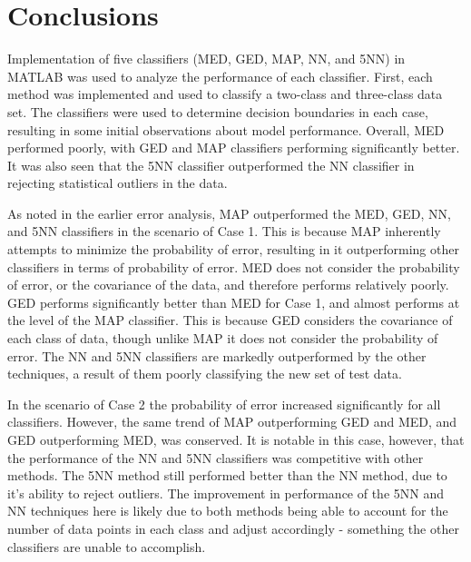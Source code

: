 \documentclass[article, 1.5space, letterpaper, 12pt, oneside, header, footer]{SydeClass}
\begin{document}


\section{Conclusions}
Implementation of five classifiers (MED, GED, MAP, NN, and 5NN) in MATLAB was used to analyze the performance of each classifier. First, each method was implemented and used to classify a two-class and three-class data set. The classifiers were used to determine decision boundaries in each case, resulting in some initial observations about model performance. Overall, MED performed poorly, with GED and MAP classifiers performing significantly better. It was also seen that the 5NN classifier outperformed the NN classifier in rejecting statistical outliers in the data.

As noted in the earlier error analysis, MAP outperformed the MED, GED, NN, and 5NN classifiers in the scenario of Case 1. This is because MAP inherently attempts to minimize the probability of error, resulting in it outperforming other classifiers in terms of probability of error. MED does not consider the probability of error, or the covariance of the data, and therefore performs relatively poorly. GED performs significantly better than MED for Case 1, and almost performs at the level of the MAP classifier. This is because GED considers the covariance of each class of data, though unlike MAP it does not consider the probability of error. The NN and 5NN classifiers are markedly outperformed by the other techniques, a result of them poorly classifying the new set of test data.

In the scenario of Case 2 the probability of error increased significantly for all classifiers. However, the same trend of MAP outperforming GED and MED, and GED outperforming MED, was conserved. It is notable in this case, however, that the performance of the NN and 5NN classifiers was competitive with other methods. The 5NN method still performed better than the NN method, due to it's ability to reject outliers. The improvement in performance of the 5NN and NN techniques here is likely due to both methods being able to account for the number of data points in each class and adjust accordingly - something the other classifiers are unable to accomplish.





\end{document}

